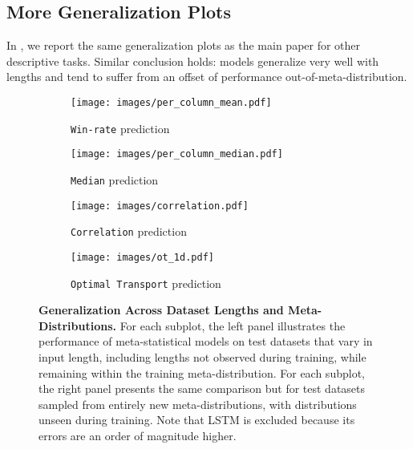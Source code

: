 \subsection{More Generalization Plots}
\label{app:gen_plots}
In , we report the same generalization plots as the main paper for other descriptive tasks. Similar conclusion holds: models generalize very well with lengths and tend to suffer from an offset of performance out-of-meta-distribution.

\begin{figure}[t] %
    \centering
    \begin{subfigure}[t]{0.49\textwidth} %
        \centering
        \texttt{[image: images/per\_column\_mean.pdf]}
        \caption{\texttt{Win-rate} prediction}
        \label{fig:subfig_a_app}
    \end{subfigure}
    \hfill
    \begin{subfigure}[t]{0.49\textwidth}
        \centering
        \texttt{[image: images/per\_column\_median.pdf]} 
        \caption{\texttt{Median} prediction}
        \label{fig:subfig_b_app}
    \end{subfigure}
    \vspace{0.5cm} %
    \begin{subfigure}[t]{0.49\textwidth}
        \centering
        \texttt{[image: images/correlation.pdf]}
        \caption{\texttt{Correlation} prediction}
        \label{fig:subfig_c_app}
    \end{subfigure}
    \hfill
    \begin{subfigure}[t]{0.49\textwidth}
        \centering
        \texttt{[image: images/ot\_1d.pdf]} 
        \caption{\texttt{Optimal Transport} prediction}
        \label{fig:subfig_d_app}
    \end{subfigure}

    \caption{\textbf{Generalization Across Dataset Lengths and Meta-Distributions.} For each subplot, the left panel illustrates the performance of meta-statistical models on test datasets that vary in input length, including lengths not observed during training, while remaining within the training meta-distribution. For each subplot, the right panel presents the same comparison but for test datasets sampled from entirely new meta-distributions, with distributions unseen during training. Note that LSTM is excluded because its errors are an order of magnitude higher.}
    \label{fig:generalization_app}
\end{figure}

